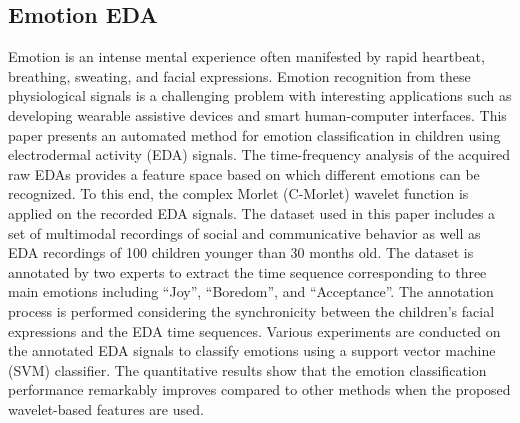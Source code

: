 \subsection{Emotion EDA}
Emotion is an intense mental experience often manifested by rapid heartbeat, breathing, 
sweating, and facial expressions. Emotion recognition from these physiological signals 
is a challenging problem with interesting applications such as developing wearable 
assistive devices and smart human-computer interfaces. This paper presents an automated 
method for emotion classification in children using electrodermal activity (EDA) signals. 
The time-frequency analysis of the acquired raw EDAs provides a feature space based on 
which different emotions can be recognized. To this end, the complex Morlet (C-Morlet) 
wavelet function is applied on the recorded EDA signals. The dataset used in this paper 
includes a set of multimodal recordings of social and communicative behavior as well 
as EDA recordings of 100 children younger than 30 months old. The dataset is annotated 
by two experts to extract the time sequence corresponding to three main emotions 
including “Joy”, “Boredom”, and “Acceptance”. The annotation process is performed 
considering the synchronicity between the children's facial expressions and the EDA 
time sequences. Various experiments are conducted on the annotated EDA signals to 
classify emotions using a support vector machine (SVM) classifier. The quantitative 
results show that the emotion classification performance remarkably improves compared 
to other methods when the proposed wavelet-based features are used.

